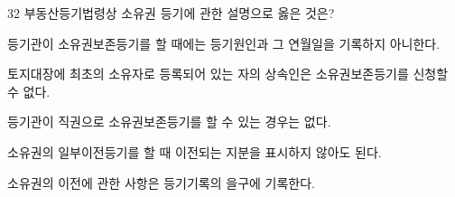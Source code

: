 \begin{question}{32}
부동산등기법령상 소유권 등기에 관한 설명으로 옳은 것은?
\begin{choices}
  \item 등기관이 소유권보존등기를 할 때에는 등기원인과 그 연월일을 기록하지 아니한다.
  \item 토지대장에 최초의 소유자로 등록되어 있는 자의 상속인은 소유권보존등기를 신청할 수 없다.
  \item 등기관이 직권으로 소유권보존등기를 할 수 있는 경우는 없다.
  \item 소유권의 일부이전등기를 할 때 이전되는 지분을 표시하지 않아도 된다.
  \item 소유권의 이전에 관한 사항은 등기기록의 을구에 기록한다.
\end{choices}
\end{question}
